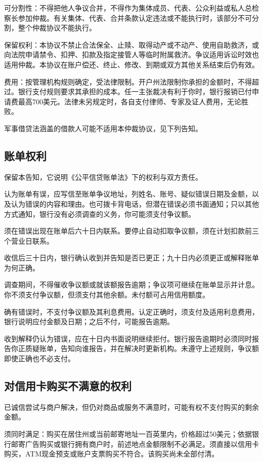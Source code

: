\documentclass[UTF8,fontset=none,11pt,a4paper]{ctexart}
\begin{document}
可分割性：不得把他人争议合并，不得作为集体成员、代表、公众利益或私人总检察长参加仲裁。有关集体、代表、合并条款认定违法或不能执行时，该部分不可分割，整个仲裁协议不能执行。


保留权利：本协议不禁止合法保全、止赎、取得动产或不动产、使用自助救济，或向法院申请禁令、扣押、扣款及指定接管人等临时附属救济。争议适用诉讼时效也适用仲裁。本协议在账户偿还、终止、修改、到期或双方其他关系结束后仍有效。


费用：按管理机构规则确定，受法律限制。开户州法限制你承担的金额时，不得超过。银行支付规则要求其承担的成本。任一主张裁决有利于你时，银行报销已付申请费最高700美元。法律未另规定时，各自支付律师、专家及证人费用，无论胜败。


军事借贷法涵盖的借款人可能不适用本仲裁协议，见下列告知。


\subsection*{账单权利}
保留本告知，它说明《公平信贷账单法》下的权利与双方责任。


认为账单有误，应写信至账单争议地址，列姓名、账号、疑似错误日期及金额，以及认为错误的内容和理由。也可拨卡背电话，但潜在错误必须书面通知；只以其他方式通知，银行没有必须调查的义务，你可能须支付争议额。


须在错误出现在账单后六十日内联系。要停止自动扣取争议额，须在计划扣款前三个营业日联系。


收信后三十日内，银行确认收到并告知是否已更正；九十日内必须更正或解释账单为何正确。


调查期间，不得催收争议额或就该额报告逾期；争议项可继续在账单显示并计息。你不须支付争议额，但须支付其他余额。未付额可占用信用额度。


确有错误时，不支付争议额及其利息费用。认定正确时，须支付及适用利息费用，银行说明应付金额及日期；之后不付，可能报告逾期。


收到解释仍认为错误，应在十日内书面说明继续拒付。银行报告逾期时必须同时报告你正质疑账单，告知向谁报告，并在解决时更新机构。未遵守上述规则，争议额即使正确也不必支付。


\subsection*{对信用卡购买不满意的权利}
已诚信尝试与商户解决，但仍对商品或服务不满意时，可能有权不支付购买的剩余金额。


须同时满足：购买在居住州或当前邮寄地址一百英里内，价格超过50美元；依据银行邮寄广告购买或银行拥有商户时，前述地点金额限制不必满足。须直接以信用卡购买，ATM现金预支或账户支票购买不符合。该购买尚未全部付清。
\end{document}
